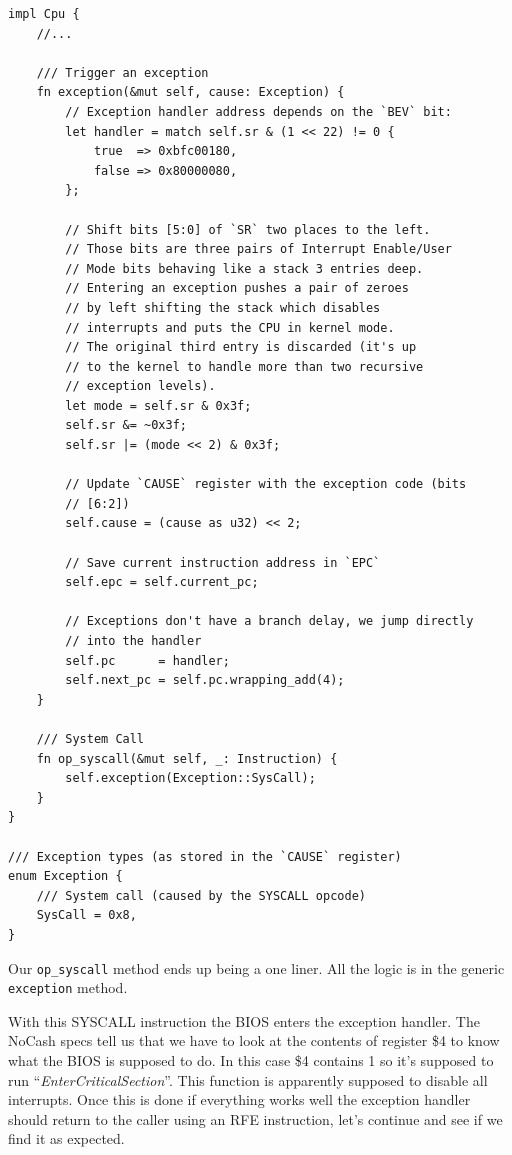 \documentclass[a4paper]{article}
\newcommand{\code}[1] {\texttt{#1}}
\begin{document}
\begin{lstlisting}
impl Cpu {
    //...

    /// Trigger an exception
    fn exception(&mut self, cause: Exception) {
        // Exception handler address depends on the `BEV` bit:
        let handler = match self.sr & (1 << 22) != 0 {
            true  => 0xbfc00180,
            false => 0x80000080,
        };

        // Shift bits [5:0] of `SR` two places to the left.
        // Those bits are three pairs of Interrupt Enable/User
        // Mode bits behaving like a stack 3 entries deep.
        // Entering an exception pushes a pair of zeroes
        // by left shifting the stack which disables
        // interrupts and puts the CPU in kernel mode.
        // The original third entry is discarded (it's up
        // to the kernel to handle more than two recursive
        // exception levels).
        let mode = self.sr & 0x3f;
        self.sr &= ~0x3f;
        self.sr |= (mode << 2) & 0x3f;

        // Update `CAUSE` register with the exception code (bits
        // [6:2])
        self.cause = (cause as u32) << 2;

        // Save current instruction address in `EPC`
        self.epc = self.current_pc;

        // Exceptions don't have a branch delay, we jump directly
        // into the handler
        self.pc      = handler;
        self.next_pc = self.pc.wrapping_add(4);
    }

    /// System Call
    fn op_syscall(&mut self, _: Instruction) {
        self.exception(Exception::SysCall);
    }
}

/// Exception types (as stored in the `CAUSE` register)
enum Exception {
    /// System call (caused by the SYSCALL opcode)
    SysCall = 0x8,
}
\end{lstlisting}

Our \code{op\_syscall} method ends up being a one liner. All the logic
is in the generic \code{exception} method.

With this SYSCALL instruction the BIOS enters the exception
handler. The NoCash specs tell us that we have to look at the contents
of register \$4 to know what the BIOS is supposed to do. In this case
\$4 contains 1 so it's supposed to run
``\textit{EnterCriticalSection}''. This function is apparently
supposed to disable all interrupts. Once this is done if everything
works well the exception handler should return to the caller using an
RFE instruction, let's continue and see if we find it as expected.
\end{document}
